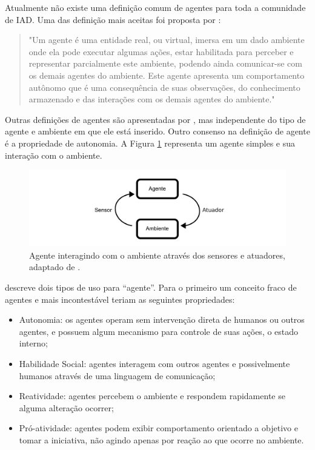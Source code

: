 Atualmente não existe uma definição comum de agentes para toda a comunidade de IAD. Uma das definição mais aceitas foi proposta por \citet{ferber1991agent}:
\begin{quotation}
"Um agente é uma entidade real, ou virtual, imersa em um dado ambiente onde ela pode executar algumas ações, estar habilitada para perceber e representar parcialmente este ambiente, podendo ainda comunicar-se com os demais agentes do ambiente. Este agente apresenta um comportamento autônomo que é uma consequência de suas observações, do conhecimento armazenado e das interações com os demais agentes do ambiente."
\end{quotation}

Outras definições de agentes são apresentadas por \cite{wooldridge1995intelligent,franklin1996agent,russell2002artificial}, mas independente do tipo de agente e ambiente em que ele está inserido. Outro consenso na definição de agente é a propriedade de autonomia. A Figura \ref{fig:agente} representa um agente simples e sua interação com o ambiente.

\begin{figure}[ht]
\centering
\includegraphics[scale=0.8]{imagens/agente.pdf}
\caption{Agente interagindo com o ambiente através dos sensores e atuadores, adaptado de \cite{russell2002artificial}.}
\label{fig:agente}
\end{figure}

\citet{wooldridge1995intelligent} descreve dois tipos de uso para “agente”. Para o primeiro um conceito fraco de agentes e mais incontestável teriam as seguintes propriedades:

\begin{itemize}
\item Autonomia: os agentes operam sem intervenção direta de humanos ou outros agentes, e possuem algum mecanismo para controle de suas ações, o estado interno;
\item Habilidade Social: agentes interagem com outros agentes e possivelmente humanos através de uma linguagem de comunicação;
\item Reatividade: agentes percebem o ambiente e respondem rapidamente se alguma alteração ocorrer;
\item Pró-atividade: agentes podem exibir comportamento orientado a objetivo e tomar a iniciativa, não agindo apenas por reação ao que ocorre no ambiente.
\end{itemize}

